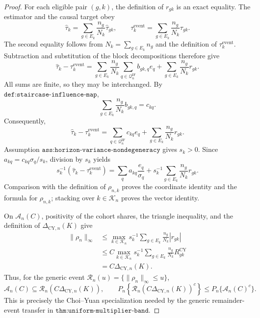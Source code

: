\documentclass{article}
\begin{document}
\begin{proof}
For each eligible pair \((g,k)\), the definition of \(r_{gk}\) is an
exact equality.  The estimator and the causal target obey
\[
 \widehat\tau_k=\sum_{g\in E_k}\frac{n_g}{N_k}\widehat\tau_{gk},
 \qquad
 \tau_k^{\mathrm{event}}
 =\sum_{g\in E_k}\frac{n_g}{N_k}\tau_{gk}.
\]
The second equality follows from \(N_k=\sum_{g\in E_k}n_g\) and the
definition of \(\tau_k^{\mathrm{event}}\).  Subtraction and substitution
of the block decompositions therefore give
\[
 \widehat\tau_k-\tau_k^{\mathrm{event}}
 =\sum_{g\in E_k}\frac{n_g}{N_k}
   \sum_{q\in\mathcal Q_n^{\mathrm{IF}}}b_{gk,q}e_q
  +\sum_{g\in E_k}\frac{n_g}{N_k}r_{gk}.
\]
All sums are finite, so they may be interchanged.  By
\(\texttt{def:staircase-influence-map}\),
\[
 \sum_{g\in E_k}\frac{n_g}{N_k}b_{gk,q}=c_{kq}.
\]
Consequently,
\[
 \widehat\tau_k-\tau_k^{\mathrm{event}}
 =\sum_{q\in\mathcal Q_n^{\mathrm{IF}}}c_{kq}e_q
  +\sum_{g\in E_k}\frac{n_g}{N_k}r_{gk}.
\]
Assumption \(\texttt{ass:horizon-variance-nondegeneracy}\) gives
\(s_k>0\).  Since \(a_{kq}=c_{kq}\sigma_q/s_k\), division by \(s_k\)
yields
\[
 s_k^{-1}(\widehat\tau_k-\tau_k^{\mathrm{event}})
 =\sum_q a_{kq}\frac{e_q}{\sigma_q}
  +s_k^{-1}\sum_{g\in E_k}\frac{n_g}{N_k}r_{gk}.
\]
Comparison with the definition of \(\rho_{n,k}\) proves the coordinate
identity and the formula for \(\rho_{n,k}\); stacking over
\(k\in\mathcal K_n\) proves the vector identity.

On \(\mathcal A_n(C)\), positivity of the cohort shares, the triangle
inequality, and the definition of \(\Delta_{\mathrm{CY},n}(K)\) give
\[
 \begin{aligned}
 \|\rho_n\|_\infty
 &\le \max_{k\in\mathcal K_n}s_k^{-1}
       \sum_{g\in E_k}\frac{n_g}{N_k}|r_{gk}|\\
 &\le C\max_{k\in\mathcal K_n}s_k^{-1}
       \sum_{g\in E_k}\frac{n_g}{N_k}R_{gk}^{\mathrm{CY}}\\
 &=C\Delta_{\mathrm{CY},n}(K).
 \end{aligned}
\]
Thus, for the generic event
\(\mathcal R_n(u)=\{\|\rho_n\|_\infty\le u\}\),
\[
 \mathcal A_n(C)\subseteq
 \mathcal R_n\!\left(C\Delta_{\mathrm{CY},n}(K)\right),
 \qquad
 P_n\!\left\{\mathcal R_n\!\left(C\Delta_{\mathrm{CY},n}(K)\right)^c\right\}
 \le P_n\{\mathcal A_n(C)^c\}.
\]
This is precisely the Choi--Yuan specialization needed by the generic
remainder-event transfer in \(\texttt{thm:uniform-multiplier-band}\).


\end{proof}
\end{document}
